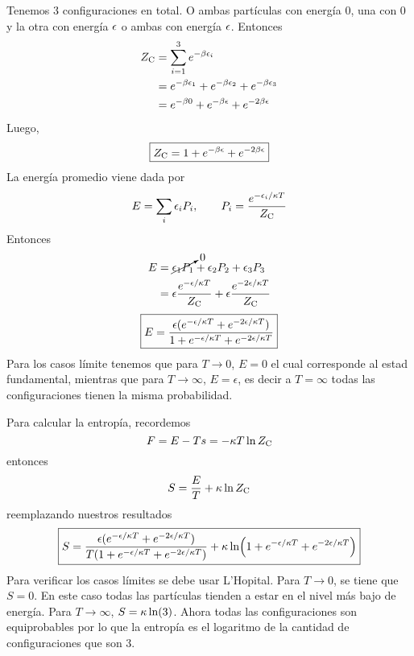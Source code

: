 \begin{sol}
	Tenemos $3$ configuraciones en total. O ambas partículas con energía $0$, una con $0$ y la otra con energía $\epsilon$ o ambas con energía $\epsilon$. 
Entonces
\begin{align}
  Z_{\rm C}&=\sum_{i=1}^3e^{-\beta \epsilon _i}\\
  &=e^{-\beta \epsilon_1}+e^{-\beta \epsilon_2}+e^{-\beta \epsilon_3}\\
  &=e^{-\beta 0}+e^{-\beta \epsilon}+e^{-2\beta \epsilon}
\end{align}
Luego,
\begin{equation}
 \boxed{ Z_{\rm C}=1+e^{-\beta \epsilon}+e^{-2\beta \epsilon}}
\end{equation}
La energía promedio viene dada por
\begin{equation}
  E=\sum_i \epsilon_iP_i,\qquad P_i=\frac{e^{-\epsilon_i/\kappa T}}{Z_{\rm C}}
\end{equation}
Entonces
\begin{align}
  E&=\cancelto{0}{\epsilon_1P_1}+\epsilon_2P_2+\epsilon_3P_3\\
  &=\epsilon \frac{e^{-\epsilon/\kappa T}}{Z_{\rm C}}+\epsilon \frac{e^{-2\epsilon/\kappa T}}{Z_{\rm C}}
\end{align}
\begin{equation}
\boxed{  E=\frac{\epsilon (e^{-\epsilon/\kappa T}+e^{-2\epsilon/\kappa T})}{1+e^{- \epsilon/\kappa T}+e^{-2 \epsilon/\kappa T}}}
\end{equation}
Para los casos límite tenemos que para $T\to 0$, $E=0$ el cual corresponde al estad fundamental, mientras que para $T\to\infty$, $E=\epsilon$, es decir a $T=\infty$ todas las configuraciones tienen la misma probabilidad.

Para calcular la entropía, recordemos
\begin{equation}
  F=E-Ts=-\kappa T\ln Z_{\rm C}
\end{equation}
entonces
\begin{equation}
  S=\frac{E}{T}+\kappa\ln Z_{\rm C}
\end{equation}
reemplazando nuestros resultados
\begin{equation}
 \boxed{S=\frac{\epsilon(e^{-\epsilon/\kappa T}+e^{-2\epsilon/\kappa T})}{T(1+e^{- \epsilon/\kappa T}+e^{-2 \epsilon/\kappa T})}+\kappa\ln(1+e^{- \epsilon/\kappa T}+e^{-2 \epsilon/\kappa T})}
\end{equation}
Para verificar los casos límites se debe usar L'Hopital. Para $T\to 0$, se tiene que $S=0$. En este caso todas las partículas tienden a estar en el nivel más bajo de energía. Para $T\to\infty$, $S=\kappa \ln( 3)$. Ahora todas las configuraciones son equiprobables por lo que la entropía es el logaritmo de la cantidad de configuraciones que son $3$.


\end{sol}

